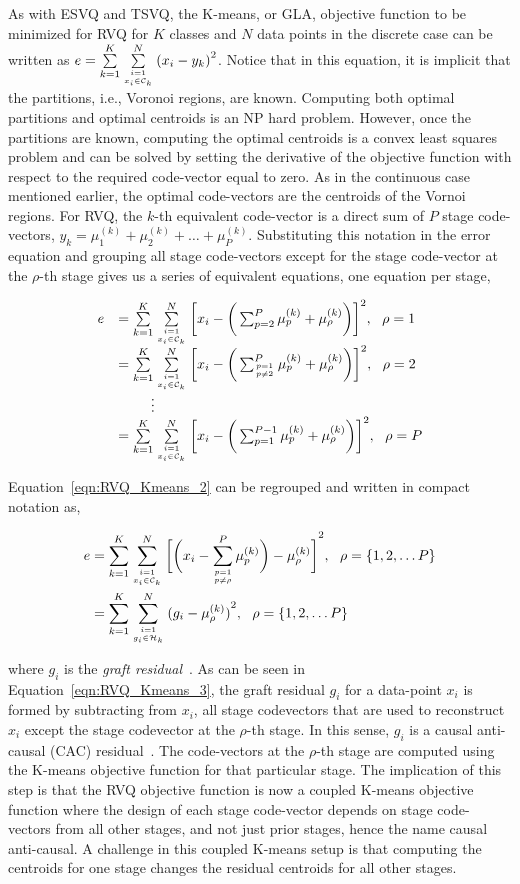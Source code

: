 \documentclass{article}
\begin{document}
As with ESVQ and TSVQ, the K-means, or GLA, objective function to be minimized for RVQ for $K$ classes and $N$ data points in the discrete case can be written as $e = \sum\limits_{k=1}^K \sum\limits_{{i=1 \atop x_i \in \mathcal{C}_k}}^N {(x_i - y_k)}^2$.  Notice that in this equation, it is implicit that the partitions, i.e., Voronoi regions, are known.  Computing both optimal partitions and optimal centroids is an NP hard problem.  However, once the partitions are known, computing the optimal centroids is a convex least squares problem and can be solved by setting the derivative of the objective function with respect to the required code-vector equal to zero.  As in the continuous case mentioned earlier, the optimal code-vectors are the centroids of the Vornoi regions.  For RVQ, the $k$-th equivalent code-vector is a direct sum of $P$ stage code-vectors, $y_k = \mu_1^{(k)} + \mu_2^{(k)} + \ldots + \mu_P^{(k)}$.  Substituting this notation in the error equation and grouping all stage code-vectors except for the stage code-vector at the $\rho$-th stage gives us a series of equivalent equations, one equation per stage,
 
\begin{equation*}
\begin{array}{llll}
e&= \sum\limits_{k=1}^K \sum\limits_{{i=1 \atop x_i \in \mathcal{C}_k}}^N{\bigg[x_i -\bigg(\sum_{p=2}^P\mu^{(k)}_p+ \mu^{(k)}_\rho\bigg)\bigg]}^2, \ \ \rho=1\\
&= \sum\limits_{k=1}^K \sum\limits_{{i=1 \atop x_i \in \mathcal{C}_k}}^N{\bigg[x_i -\bigg(\sum_{p=1 \atop p \neq 2}^P\mu^{(k)}_p+ \mu^{(k)}_\rho\bigg)\bigg]}^2, \ \ \rho=2\\
&\ \ \ \  \ \ \ \vdots\notag\\
&=\sum\limits_{k=1}^K \sum\limits_{{i=1 \atop x_i \in \mathcal{C}_k}}^N{\bigg[x_i -\bigg(\sum_{p=1}^{P-1}\mu^{(k)}_p+ \mu^{(k)}_\rho\bigg)\bigg]}^2, \ \ \rho=P
\end{array}
\label{eqn:RVQ_Kmeans_2}
\end{equation*}


Equation~\ref{eqn:RVQ_Kmeans_2} can be regrouped and written in compact notation as,

\begin{align}
e&= \KmeansSum{\bigg[\RVQmultipleKmeansonealternate\bigg]}^2, \ \ \rho=\{1, 2, \ldots P\}\notag\\
&={\RVQerroralternate}, \ \ \rho=\{1, 2, \ldots P\}
\label{eqn:RVQ_Kmeans_3}
\end{align}

where $g_i$ is the \emph{graft residual}~\cite{1993_JNL_RVQDSC_Barnes}.   As can be seen in Equation~\ref{eqn:RVQ_Kmeans_3}, the graft residual $g_i$ for a data-point $x_i$ is formed by subtracting from $x_i$, all stage codevectors that are used to reconstruct $x_i$ except the stage codevector at the $\rho$-th stage.  In this sense, $g_i$ is a causal anti-causal (CAC) residual~\cite{1993_JNL_RVQDSC_Barnes}.  The code-vectors at the $\rho$-th stage are computed using the K-means objective function for that particular stage.  The implication of this step is that the RVQ objective function is now a coupled K-means objective function where the design of each stage code-vector depends on stage code-vectors from all other stages, and not just prior stages, hence the name causal anti-causal.    A challenge in this coupled K-means setup is that computing the centroids for one stage changes the residual centroids for all other stages.  
\end{document}
